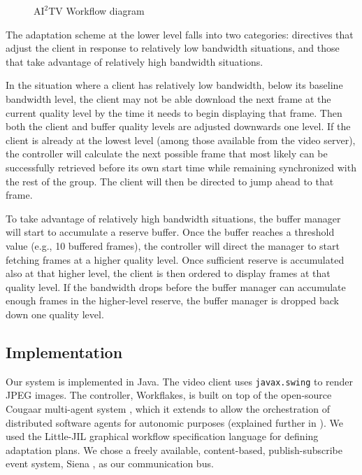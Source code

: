 \documentclass{sig-alternate}
\begin{document}
%
%

\begin{figure} 
  \centering
  \hspace*{-5mm}
  \caption{$\mathrm{AI}^2$TV Workflow diagram }
  \label{ljil}
\end{figure}

The adaptation scheme at the lower level falls into two categories:
directives that adjust the client in response to relatively low
bandwidth situations, and those that take advantage of relatively high
bandwidth situations.

In the situation where a client has relatively low bandwidth, below
its baseline bandwidth level, the client may not be able download the
next frame at the current quality level by the time it needs to begin
displaying that frame.  Then both the client and buffer quality levels
are adjusted downwards one level.  If the client is already at the
lowest level (among those available from the video server), the
controller will calculate the next possible frame that most likely can
be successfully retrieved before its own start time while remaining
synchronized with the rest of the group.  The client will then be
directed to jump ahead to that frame.

To take advantage of relatively high bandwidth situations, the buffer
manager will start to accumulate a reserve buffer.  Once the buffer
reaches a threshold value (e.g., 10 buffered frames), the controller
will direct the manager to start fetching frames at a higher quality
level.  Once sufficient reserve is accumulated also at that higher
level, the client is then ordered to display frames at that quality
level.  If the bandwidth drops before the buffer manager can
accumulate enough frames in the higher-level reserve, the buffer
manager is dropped back down one quality level.

\subsection{Implementation} \label{implementation}

Our system is implemented in Java. The video client uses
\texttt{javax.swing} to render JPEG images.  The controller,
Workflakes, is built on top of the open-source Cougaar multi-agent
system \cite{COUGAAR}, which it extends to allow the orchestration of
distributed software agents for autonomic purposes (explained further
in \cite{ICSE}).  We used the Little-JIL graphical workflow
specification language \cite{LJIL} for defining adaptation plans.  We
chose a freely available, content-based, publish-subscribe event
system, Siena \cite{SIENA}, as our communication bus.
\end{document}
